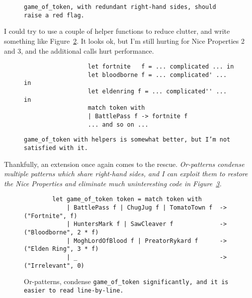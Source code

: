 \documentclass[manuscript,screen,review, 12pt, nonacm]{acmart}
\begin{document}
\begin{outline}[enumerate]
\begin{figure}
        \caption{\tt{game\_of\_token}, with redundant right-hand sides,
        should raise a red flag.} 
        \label{fig:baregot}
        \end{figure}

        I could try to use a couple of helper functions to reduce clutter, and
        write something like Figure~\ref{fig:helpergot}. It looks ok, but I'm
        still hurting for Nice Properties 2 and 3, and the additional calls
        hurt performance. 

        \begin{figure}
            \begin{center}
                \begin{verbatim}
                  let fortnite   f = ... complicated ... in
                  let bloodborne f = ... complicated' ... in
                  let eldenring f = ... complicated'' ... in
                  match token with
                  | BattlePass f -> fortnite f
                  ... and so on ...                
                \end{verbatim}
            \end{center}    
        \caption{\tt{game\_of\_token} with helpers is somewhat better, but I'm
        not satisfied with it.} 
        \label{fig:helpergot}
        \end{figure}

        Thankfully, an extension once again comes to the rescue.
        \it{Or-patterns} condense multiple patterns which share right-hand
        sides, and I can exploit them to restore the Nice Properties and
        eliminate much uninteresting code in Figure~\ref{fig:orgot}.

    \begin{figure}
    \begin{center}
    \begin{verbatim}
        let game_of_token token = match token with 
            | BattlePass f | ChugJug f | TomatoTown f  -> ("Fortnite", f)
            | HuntersMark f | SawCleaver f             -> ("Bloodborne", 2 * f)
            | MoghLordOfBlood f | PreatorRykard f      -> ("Elden Ring", 3 * f)
            | _                                        -> ("Irrelevant", 0)
    \end{verbatim}
    \end{center}    
    \caption{Or-patterns, condense \tt{game\_of\_token}
    significantly, and it is easier to read line-by-line.} 
    \label{fig:orgot}
    \end{figure}


\end{outline}
\end{document}

